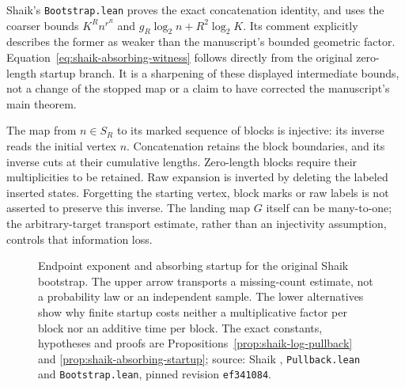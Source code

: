 \documentclass[11pt]{article}
\theoremstyle{remark}\newtheorem{remark}[proposition]{Remark}
\begin{document}
Shaik's \texttt{Bootstrap.lean} proves the exact concatenation identity,
and uses the coarser bounds \(K^R n^{r^R}\) and
\(g_R\log_2n+R^2\log_2K\). Its comment explicitly describes the former
as weaker than the manuscript's bounded geometric factor.
Equation~\eqref{eq:shaik-absorbing-witness} follows directly from the
original zero-length startup branch. It is a sharpening of these
displayed intermediate bounds, not a change of the stopped map or
a claim to have corrected the manuscript's main theorem.

The map from \(n\in S_R\) to its marked sequence of blocks is injective:
its inverse reads the initial vertex \(n\).
Concatenation retains the block boundaries, and its inverse cuts at
their cumulative lengths. Zero-length blocks require their multiplicities
to be retained. Raw expansion is inverted by deleting the labeled
inserted states. Forgetting the starting vertex, block marks or raw
labels is not asserted to preserve this inverse.
The landing map \(G\) itself can be many-to-one; the arbitrary-target
transport estimate, rather than an injectivity assumption, controls
that information loss.

\begin{figure}[ht]
\centering
{}
\caption{Endpoint exponent and absorbing startup for the original
Shaik bootstrap. The upper arrow transports a missing-count estimate,
not a probability law or an independent sample.
The lower alternatives show why finite startup costs neither a
multiplicative factor per block nor an additive time per block.
The exact constants, hypotheses and proofs are
Propositions~\ref{prop:shaik-log-pullback} and
\ref{prop:shaik-absorbing-startup}; source:
Shaik \cite{Shaik2026v324}, \texttt{Pullback.lean} and
\texttt{Bootstrap.lean}, pinned revision \texttt{ef341084}.}
\end{figure}
\end{document}
